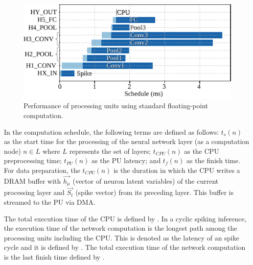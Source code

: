 \begin{figure}[!t]
	\centering
	\includegraphics[width=1\columnwidth]{../figures/latency_pu_fp.pdf}
	\caption{Performance of processing units using standard floating-point computation.}
	\label{fig:latency_pu_fp}
\end{figure}

In the computation schedule, the following terms are defined as follows: $t_s(n)$ as the start time for the processing of the neural network layer (as a computation node) $n\in L$ where $L$ represents the set of layers; $t_{CPU}(n)$ as the CPU preprocessing time; $t_{PU}(n)$ as the PU latency; and $t_f(n)$ as the finish time. For data preparation, the $t_{CPU}(n)$ is the duration in which the CPU writes a DRAM buffer with $\vec{h_\mu}$ (vector of neuron latent variables) of the current processing layer and $\vec{S_t}$ (spike vector) from its preceding layer. This buffer is streamed to the PU via DMA.

The total execution time of the CPU is defined by . In a cyclic spiking inference, the execution time of the network computation is the longest path among the processing units including the CPU. This is denoted as the latency of an spike cycle and it is defined by . The total execution time of the network computation is the last finish time defined by .

